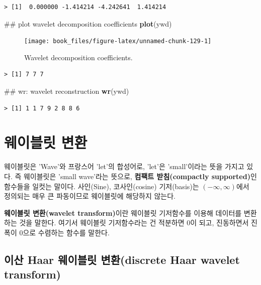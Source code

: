 \documentclass[b5paper,]{scrbook}
\makeatletter
\newenvironment{Shaded}{\begin{snugshade}}{\end{snugshade}}
\newcommand{\KeywordTok}[1]{\textcolor[rgb]{0.13,0.29,0.53}{\textbf{{#1}}}}
\newcommand{\NormalTok}[1]{{#1}}
\theoremstyle{plain}
\theoremstyle{definition}
\numberwithin{equation}{section}
\newenvironment{kframe}{%
\medskip{}
\setlength{\fboxsep}{.8em}
 \def\at@end@of@kframe{}%
 \ifinner\ifhmode%
  \def\at@end@of@kframe{\end{minipage}}%
  \begin{minipage}{\columnwidth}%
 \fi\fi%
 \def\FrameCommand##1{\hskip\@totalleftmargin \hskip-\fboxsep
 \colorbox{shadecolor}{##1}\hskip-\fboxsep
     \hskip-\linewidth \hskip-\@totalleftmargin \hskip\columnwidth}%
 \MakeFramed {\advance\hsize-\width
   \@totalleftmargin\z@ \linewidth\hsize
   \@setminipage}}%
 {\par\unskip\endMakeFramed%
 \at@end@of@kframe}
\renewenvironment{Shaded}{\begin{kframe}}{\end{kframe}}
\makeatother
\begin{document}
\begin{verbatim}
> [1]  0.000000 -1.414214 -4.242641  1.414214
\end{verbatim}

\begin{Shaded}
\begin{Highlighting}[]
\NormalTok{## plot wavelet decomposition coefficients}
\KeywordTok{plot}\NormalTok{(ywd)}
\end{Highlighting}
\end{Shaded}

\begin{figure}

{\centering \texttt{[image: book\_files/figure-latex/unnamed-chunk-129-1]} 

}

\caption{Wavelet decomposition coefficients.}\label{fig:unnamed-chunk-129}
\end{figure}

\begin{verbatim}
> [1] 7 7 7
\end{verbatim}

\begin{Shaded}
\begin{Highlighting}[]
\NormalTok{## wr: wavelet reconstruction}
\KeywordTok{wr}\NormalTok{(ywd)}
\end{Highlighting}
\end{Shaded}

\begin{verbatim}
> [1] 1 1 7 9 2 8 8 6
\end{verbatim}

\chapter{웨이블릿 변환}\label{wavelettransform}

웨이블릿은 'Wave'와 프랑스어 'let'의 합성어로, 'let'은 'small'이라는
뜻을 가지고 있다. 즉 웨이블릿은 'small wave'라는 뜻으로, \textbf{컴팩트
받침(compactly supported)}인 함수들을 일컷는 말이다. 사인(Sine),
코사인(cosine) 기저(basis)는 \((-\infty, \infty)\)에서 정의되는 매우 큰
파동이므로 웨이블릿에 해당하지 않는다.

\textbf{웨이블릿 변환(wavelet transform)}이란 웨이블릿 기저함수를 이용해
데이터를 변환하는 것을 말한다. 여기서 웨이블릿 기저함수라는 건 적분하면
0이 되고, 진동하면서 진폭이 0으로 수렴하는 함수를 말한다.

\section{이산 Haar 웨이블릿 변환(discrete Haar wavelet
transform)}\label{-haar--discrete-haar-wavelet-transform}
\end{document}
